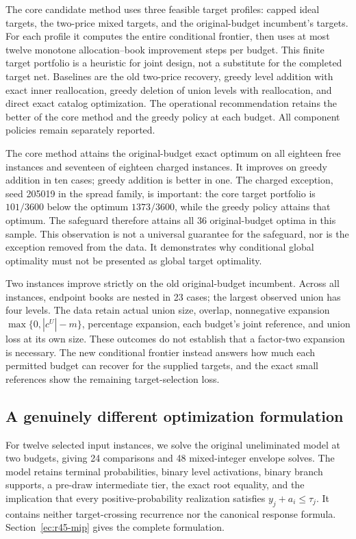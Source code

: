 The core candidate method uses three feasible target profiles: capped ideal targets, the two-price mixed targets, and the original-budget incumbent's targets. For each profile it computes the entire conditional frontier, then uses at most twelve monotone allocation--book improvement steps per budget. This finite target portfolio is a heuristic for joint design, not a substitute for the completed target net. Baselines are the old two-price recovery, greedy level addition with exact inner reallocation, greedy deletion of union levels with reallocation, and direct exact catalog optimization. The operational recommendation retains the better of the core method and the greedy policy at each budget. All component policies remain separately reported.

The core method attains the original-budget exact optimum on all eighteen free instances and seventeen of eighteen charged instances. It improves on greedy addition in ten cases; greedy addition is better in one. The charged exception, seed 205019 in the spread family, is important: the core target portfolio is $101/3600$ below the optimum $1373/3600$, while the greedy policy attains that optimum. The safeguard therefore attains all 36 original-budget optima in this sample. This observation is not a universal guarantee for the safeguard, nor is the exception removed from the data. It demonstrates why conditional global optimality must not be presented as global target optimality.

Two instances improve strictly on the old original-budget incumbent. Across all instances, endpoint books are nested in 23 cases; the largest observed union has four levels. The data retain actual union size, overlap, nonnegative expansion $\max\{0,|c^U|-m\}$, percentage expansion, each budget's joint reference, and union loss at its own size. These outcomes do not establish that a factor-two expansion is necessary. The new conditional frontier instead answers how much each permitted budget can recover for the supplied targets, and the exact small references show the remaining target-selection loss.

\subsection{A genuinely different optimization formulation}
For twelve selected input instances, we solve the original uneliminated model at two budgets, giving 24 comparisons and 48 mixed-integer envelope solves. The model retains terminal probabilities, binary level activations, binary branch supports, a pre-draw intermediate tier, the exact root equality, and the implication that every positive-probability realization satisfies $y_j+a_i\leq\tau_j$. It contains neither target-crossing recurrence nor the canonical response formula. Section~\ref{ec:r45-mip} gives the complete formulation.

